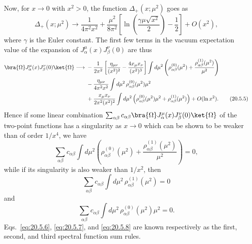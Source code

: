 Now, for $x\to0$ with $x^2>0$, the function $\Delta_+(x;\mu^2)$ goes as
\begin{equation}
\Delta_+(x;\mu^2)\longrightarrow
\frac{1}{4\pi^2x^2}
+\frac{\mu^2}{8\pi^2}
\left[
\ln\left(\frac{\gamma\mu\sqrt{x^2}}{2}\right)-\frac12
\right]
+O(x^2),
\tag{20.5.4}\label{eq:20.5.4}
\end{equation}
where $\gamma$ is the Euler constant. The first few terms in the vacuum expectation value of the expansion of $J_\alpha^\mu(x)J_\beta^\nu(0)$ are thus
\begin{align}
\bra{\Omega}J_\alpha^\mu(x)J_\beta^\nu(0)\ket{\Omega}
\longrightarrow{}&
-\frac{1}{2\pi^2}
\left[
\frac{\eta_{\mu\nu}}{(x^2)^2}
-\frac{4x_\mu x_\nu}{(x^2)^3}
\right]
\int d\mu^2
\left(
\rho_{\alpha\beta}^{(0)}(\mu^2)
+\frac{\rho_{\alpha\beta}^{(1)}(\mu^2)}{\mu^2}
\right)
\notag\\
&-\frac{\eta_{\mu\nu}}{4\pi^2x^2}
\int d\mu^2\,\rho_{\alpha\beta}^{(0)}(\mu^2)\mu^2
\notag\\
&+\frac{x_\mu x_\nu}{2\pi^2(x^2)^2}
\int d\mu^2
\left(
\rho_{\alpha\beta}^{(0)}(\mu^2)\mu^2
+\rho_{\alpha\beta}^{(1)}(\mu^2)
\right)
+O(\ln x^2).
\tag{20.5.5}\label{eq:20.5.5}
\end{align}
Hence if some linear combination $\sum_{\alpha\beta}c_{\alpha\beta}\bra{\Omega}J_\alpha^\mu(x)J_\beta^\nu(0)\ket{\Omega}$ of the two-point functions has a singularity as $x\to0$ which can be shown to be weaker than of order $1/x^4$, we have
\begin{equation}
\sum_{\alpha\beta}c_{\alpha\beta}
\int d\mu^2
\left(
\rho_{\alpha\beta}^{(0)}(\mu^2)
+\frac{\rho_{\alpha\beta}^{(1)}(\mu^2)}{\mu^2}
\right)=0,
\tag{20.5.6}\label{eq:20.5.6}
\end{equation}
while if its singularity is also weaker than $1/x^2$, then
\begin{equation}
\sum_{\alpha\beta}c_{\alpha\beta}
\int d\mu^2\,\rho_{\alpha\beta}^{(1)}(\mu^2)=0
\tag{20.5.7}\label{eq:20.5.7}
\end{equation}
and
\begin{equation}
\sum_{\alpha\beta}c_{\alpha\beta}
\int d\mu^2\,\rho_{\alpha\beta}^{(0)}(\mu^2)\mu^2=0.
\tag{20.5.8}\label{eq:20.5.8}
\end{equation}
Eqs.~\eqref{eq:20.5.6}, \eqref{eq:20.5.7}, and \eqref{eq:20.5.8} are known respectively as the first, second, and third spectral function sum rules.

